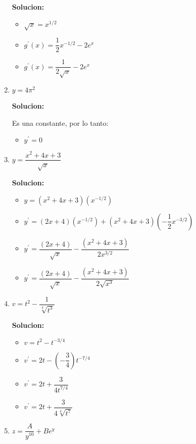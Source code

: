 \documentclass{article}
\begin{document}
\begin{enumerate}[start=5, label=\textbf{\arabic*.}]
    \textbf{Solucion: }
    \begin{itemize}
        \item $\sqrt{x} = x^{1/2}$
        \item $g^{\prime}(x) = \dfrac{1}{2}x^{-1/2} - 2e^x$
        \item $g^{\prime}(x) = \dfrac{1}{2\sqrt{x}} - 2e^x$
    \end{itemize}
    \vspace{0.5em}
    \item $y = 4\pi^2$
    
    \textbf{Solucion: }

    Es una constante, por lo tanto:
    \begin{itemize}
        \item $y^{\prime} = 0$
    \end{itemize}
    \vspace{0.5em}
    \item $y = \dfrac{x^2+4x+3}{\sqrt{x}}$
    
    \textbf{Solucion: }
    \begin{itemize}
        \item $y = (x^2+4x+3)(x^{-1/2})$
        \item $y^{\prime} = (2x+4)(x^{-1/2}) + (x^2+4x+3)(-\dfrac{1}{2}x^{-3/2})$
        \item $y^{\prime} = \dfrac{(2x+4)}{\sqrt{x}} - \dfrac{(x^2+4x+3)}{2x^{3/2}}$
        \item $y^{\prime} = \dfrac{(2x+4)}{\sqrt{x}} - \dfrac{(x^2+4x+3)}{2\sqrt{x^3}}$
    \end{itemize}
    \vspace{0.5em}

    \item $v = t^2-\dfrac{1}{\sqrt[4]{t^3}}$
    
    \textbf{Solucion: }
    \begin{itemize}
        \item $v = t^2 - t^{-3/4}$
        \item $v^{\prime} = 2t - (-\dfrac{3}{4})t^{-7/4}$
        \item $v^{\prime} = 2t + \dfrac{3}{4t^{7/4}}$
        \item $v^{\prime} = 2t + \dfrac{3}{4\sqrt[4]{t^7}}$
    \end{itemize}
    \vspace{0.5em}

    \item $z = \dfrac{A}{y^{10}}+Be^y$
    

\end{enumerate}
\end{document}
